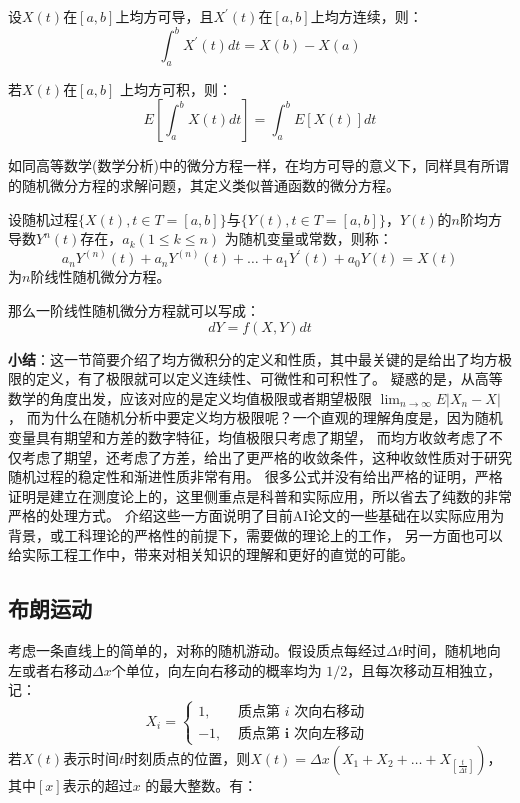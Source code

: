 \begin{theorem}[牛顿-莱布尼茨公式]
  设$X(t)$在$[a, b]$上均方可导，且$X^{\prime}(t)$在$[a, b]$上均方连续，则：
  \begin{equation}
    \int_a^b X^{\prime}(t) d t=X(b)-X(a)
  \end{equation}
\end{theorem}

\begin{theorem}
  若$X(t)$在$[a, b]$ 上均方可积，则：
  \begin{equation}
    E\left[\int_a^b X(t) d t\right]=\int_a^b E[X(t)] d t
  \end{equation}
\end{theorem}

如同高等数学(数学分析)中的微分方程一样，在均方可导的意义下，同样具有所谓的随机微分方程的求解问题，其定义类似普通函数的微分方程。

\begin{definition}
  设随机过程$\{X(t), t \in T =[a, b] \}$与$\{Y(t), t \in T =[a, b] \}$，$Y(t)$的$n$阶均方导数$Y^{n}(t)$存在，$a_k(1 \leq k \leq n)$
  为随机变量或常数，则称：
  \begin{equation}
    a_n Y^{(n)}(t)+a_n Y^{(n)}(t)+\ldots+a_1 Y^{\prime}(t)+a_0 Y(t)=X(t)
  \end{equation}
  为$n$阶线性随机微分方程。
\end{definition}
那么一阶线性随机微分方程就可以写成：
\begin{equation}
  dY = f(X, Y) dt
\end{equation}

\textbf{小结}：这一节简要介绍了均方微积分的定义和性质，其中最关键的是给出了均方极限的定义，有了极限就可以定义连续性、可微性和可积性了。
疑惑的是，从高等数学的角度出发，应该对应的是定义均值极限或者期望极限 $\lim_{n\rightarrow \infty}E|X_n - X|$，
而为什么在随机分析中要定义均方极限呢？一个直观的理解角度是，因为随机变量具有期望和方差的数字特征，均值极限只考虑了期望，
而均方收敛考虑了不仅考虑了期望，还考虑了方差，给出了更严格的收敛条件，这种收敛性质对于研究随机过程的稳定性和渐进性质非常有用。
很多公式并没有给出严格的证明，严格证明是建立在测度论上的，这里侧重点是科普和实际应用，所以省去了纯数的非常严格的处理方式。
介绍这些一方面说明了目前AI论文的一些基础在以实际应用为背景，或工科理论的严格性的前提下，需要做的理论上的工作，
另一方面也可以给实际工程工作中，带来对相关知识的理解和更好的直觉的可能。

\subsection{布朗运动}
考虑一条直线上的简单的，对称的随机游动。假设质点每经过$\Delta t$时间，随机地向左或者右移动$\Delta x$个单位，向左向右移动的概率均为
$1/2$，且每次移动互相独立，记：
\begin{equation}
  X_i= \begin{cases}1, & \text { 质点第 } i \text { 次向右移动 } \\ -1, & \text { 质点第 } \boldsymbol{i} \text { 次向左移动 }\end{cases}
\end{equation}
若$X(t)$表示时间$t$时刻质点的位置，则$X(t)=\Delta x(X_1 + X_2 + \dots + X_{[\frac{t}{\Delta t}]})$，其中$[x]$表示的超过$x$
的最大整数。有：

